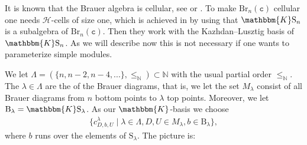 \documentclass[a4paper,11pt]{amsart}
\let\emph\relax
\renewcommand{\dots}{\text{...}}
\newcommand{\setstuff}[1]{\mathrm{#1}}
\newcommand{\KK}{\mathbbm{K}}
\newcommand{\N}{\mathbb{N}}
\newcommand{\varsym}[1]{\mathtt{#1}}
\newcommand{\cvar}{\varsym{c}}
\numberwithin{equation}{section}
\begin{document}
It is known that the Brauer algebra is cellular, see 
\cite[Section 4]{GrLe-cellular} or \cite[Section 5]{AnStTu-cellular-tilting}. 
To make $\setstuff{Br}_{n}(\cvar)$ cellular one needs 
$\mathcal{H}$-cells of size one, which is achieved in 
\cite[Section 4]{GrLe-cellular} by using 
that $\KK\setstuff{S}_{n}$ is 
a subalgebra of $\setstuff{Br}_{n}(\cvar)$. Then
they work with
the Kazhdan--Lusztig 
basis of $\KK\setstuff{S}_{n}$.
As we will describe now this is not necessary if one wants 
to parameterize simple modules.

We let $\Lambda=(\{n,n-2,n-4,\dots\},\leq_{\N})\subset\N$ 
with the usual partial order $\leq_{\N}$.
The $\lambda\in\Lambda$ are the \emph{through strands} of the Brauer diagrams,
that is, we let the set $M_{\lambda}$ consist of all Brauer diagrams 
from $n$ bottom points to $\lambda$ top points.
Moreover, we let $\setstuff{B}_{\lambda}=\KK\setstuff{S}_{\lambda}$.
As our $\KK$-basis we choose 
\begin{gather*}
\{c_{D,b,U}^{\lambda}\mid\lambda\in\Lambda,D,U\in M_{\lambda},
b\in\setstuff{B}_{\lambda}\},
\end{gather*}
where $b$ runs over the elements of $\setstuff{S}_{\lambda}$.
The picture is: 
\end{document}
